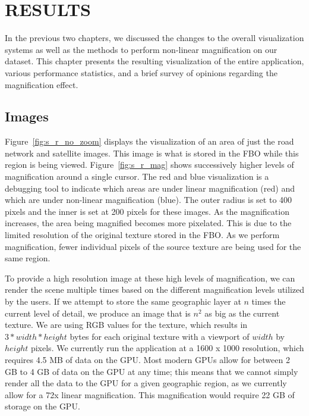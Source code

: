 
 
\chapter{RESULTS}
\label{chapter:results}

In the previous two chapters, we discussed the changes to the overall visualization systems as well as the methods to perform non-linear magnification on our dataset. This chapter presents the resulting visualization of the entire application, various performance statistics, and a brief survey of opinions regarding the magnification effect.

\section{Images}
\label{section:image_results}

Figure~\ref{fig:s_r_no_zoom} displays the visualization of an area of just the road network and satellite images. This image is what is stored in the FBO while this region is being viewed. Figure~\ref{fig:s_r_mag} shows successively higher levels of magnification around a single cursor. The red and blue visualization is a debugging tool to indicate which areas are under linear magnification (red) and which are under non-linear magnification (blue). The outer radius is set to 400 pixels and the inner is set at 200 pixels for these images. As the magnification increases, the area being magnified becomes more pixelated. This is due to the limited resolution of the original texture stored in the FBO\@. As we perform magnification, fewer individual pixels of the source texture are being used for the same region. 

To provide a high resolution image at these high levels of magnification, we can render the scene multiple times based on the different magnification levels utilized by the users. If we attempt to store the same geographic layer at $n$ times the current level of detail, we produce an image that is $n^2$ as big as the current texture. We are using RGB values for the texture, which results in $3 * width * height$ bytes for each original texture with a viewport of $width$ by $height$ pixels. We currently run the application at a 1600 x 1000 resolution, which requires 4.5 MB of data on the GPU\@. Most modern GPUs allow for between 2 GB to 4 GB
of data on the GPU at any time; this means that we cannot simply render all the data to the GPU for a given geographic region, as we currently allow for a 72x linear magnification. This magnification would require 22 GB of storage on the GPU.

